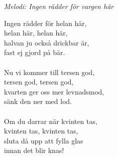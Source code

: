 {\footnotesize\textit{Melodi: Ingen rädder för vargen här}}\par
\vspace{10pt}
Ingen rädder för helan här,\\
helan här, helan här,\\
halvan ju också drickbar är,\\
fast ej gjord på bär.\\
\\
Nu vi kommer till tersen god,\\
tersen god, tersen god,\\
kvarten ger oss mer levnadsmod,\\
sänk den ner med lod.\\
\\
Om du darrar när kvinten tas,\\
kvinten tas, kvinten tas,\\
sluta då upp att fylla glas\\
innan det blir knas!
